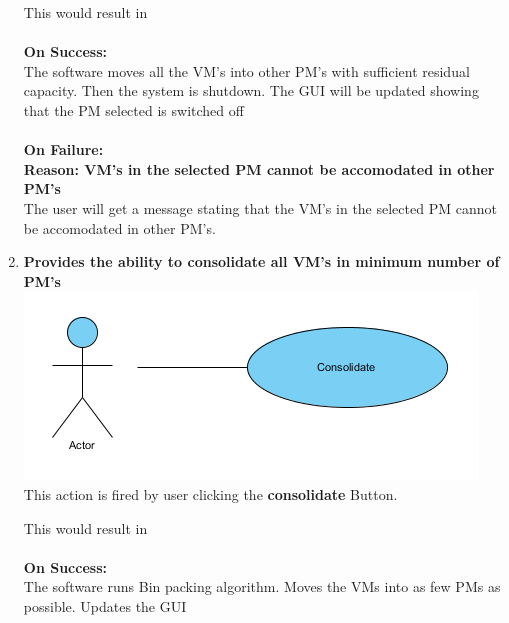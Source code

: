 \documentclass[a4paper,11pt]{article}
\begin{document}
\begin{enumerate}
				This would result in \\\\
				{\bf On Success: }\\
				The software moves all the VM's into other PM's with sufficient residual capacity. Then the system is shutdown. 
				The GUI will be updated showing that the PM selected is switched off
				\\\\
				{\bf On Failure: } \\
				{\bf Reason: VM's in the selected PM cannot be accomodated in other PM's}\\
				The user will get a message stating that the VM's in the selected PM cannot be accomodated in other PM's.
				\item {\bf Provides the ability to consolidate all VM's in minimum number of PM's}\\
				\includegraphics{images/consolidate}
 				\\This action is fired by user clicking the {\bf consolidate} Button. 
								
				This would result in \\\\
				{\bf On Success: }\\
				The software runs Bin packing algorithm. Moves the VMs into as few PMs as possible. Updates the GUI
				\\
				

			\end{enumerate}
			
			
			
			
			
\end{document}

